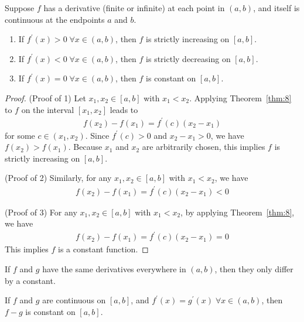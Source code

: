 \documentclass[thmcnt=section, 12pt]{my-elegantbook}
\begin{document}
\begin{theorem} \label{thm:10}
    Suppose $f$ has a derivative (finite or infinite) at each point in $(a, b)$, and itself is continuous at the endpoints $a$ and $b$.
    \begin{enumerate}
        \item If $f^\prime(x) > 0 \; \forall x \in (a, b)$, then $f$ is strictly increasing on $[a, b]$.
        \item If $f^\prime(x) < 0 \; \forall x \in (a, b)$, then $f$ is strictly decreasing on $[a, b]$.
        \item If $f^\prime(x) = 0 \; \forall x \in (a, b)$, then $f$ is constant on $[a, b]$.
    \end{enumerate}
\end{theorem}

\begin{proof}
    (Proof of 1) Let $x_1, x_2 \in [a, b]$ with $x_1 < x_2$. Applying Theorem~\ref{thm:8} to $f$ on the interval $[x_1, x_2]$ leads to
    \begin{align*}
        f(x_2) - f(x_1) = f^\prime(c) (x_2 - x_1)
    \end{align*}
    for some $c \in (x_1, x_2)$. Since $f^\prime(c) > 0$ and $x_2 - x_1 > 0$, we have $f(x_2) > f(x_1)$. Because $x_1$ and $x_2$ are arbitrarily chosen, this implies $f$ is strictly increasing on $[a, b]$.

    (Proof of 2) Similarly, for any $x_1, x_2 \in [a, b]$ with $x_1 < x_2$, we have
    \begin{align*}
        f(x_2) - f(x_1) = f^\prime(c) (x_2 - x_1) < 0
    \end{align*}

    (Proof of 3) For any $x_1, x_2 \in [a, b]$ with $x_1 < x_2$, by applying Theorem~\ref{thm:8}, we have
    \begin{align*}
        f(x_2) - f(x_1) = f^\prime(c) (x_2 - x_1) = 0
    \end{align*}
    This implies $f$ is a constant function.
\end{proof}

\par If $f$ and $g$ have the same derivatives everywhere in $(a, b)$, then they only differ by a constant.

\begin{corollary}
    If $f$ and $g$ are continuous on $[a, b]$, and $f^\prime(x) = g^\prime(x) \; \forall x \in (a, b)$, then $f - g$ is constant on $[a, b]$.
\end{corollary}
\end{document}
